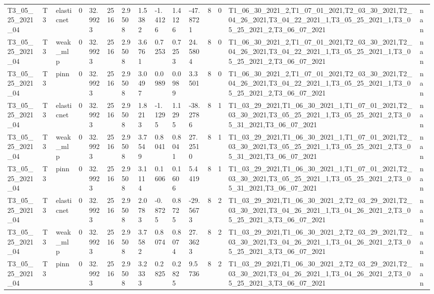 \begin{table}[t]
\begin{tabular}{lllllllllllllll}
T3\_05\_25\_2021\_04 & T3 & elasticnet & 0 & 32.9923 & 2516 & 2.9508 & 1.5382 & -1.4126 & 1.4126 & -47.8721 & 8 & 0 & T1\_06\_30\_2021\_2,T1\_07\_01\_2021,T2\_03\_30\_2021,T2\_04\_26\_2021,T3\_04\_22\_2021\_1,T3\_05\_25\_2021\_1,T3\_05\_25\_2021\_2,T3\_06\_07\_2021 & nan \\
T3\_05\_25\_2021\_04 & T3 & weak\_mlp & 0 & 32.9923 & 2516 & 2.9508 & 3.6761 & 0.7253 & 0.7253 & 24.5804 & 8 & 0 & T1\_06\_30\_2021\_2,T1\_07\_01\_2021,T2\_03\_30\_2021,T2\_04\_26\_2021,T3\_04\_22\_2021\_1,T3\_05\_25\_2021\_1,T3\_05\_25\_2021\_2,T3\_06\_07\_2021 & nan \\
T3\_05\_25\_2021\_04 & T3 & pinn & 0 & 32.9923 & 2516 & 2.9508 & 3.0497 & 0.0989 & 0.0989 & 3.3501 & 8 & 0 & T1\_06\_30\_2021\_2,T1\_07\_01\_2021,T2\_03\_30\_2021,T2\_04\_26\_2021,T3\_04\_22\_2021\_1,T3\_05\_25\_2021\_1,T3\_05\_25\_2021\_2,T3\_06\_07\_2021 & nan \\
T3\_05\_25\_2021\_04 & T3 & elasticnet & 0 & 32.9923 & 2516 & 2.9508 & 1.8213 & -1.1295 & 1.1295 & -38.2786 & 8 & 1 & T1\_03\_29\_2021,T1\_06\_30\_2021\_1,T1\_07\_01\_2021,T2\_03\_30\_2021,T3\_05\_25\_2021\_1,T3\_05\_25\_2021\_2,T3\_05\_31\_2021,T3\_06\_07\_2021 & nan \\
T3\_05\_25\_2021\_04 & T3 & weak\_mlp & 0 & 32.9923 & 2516 & 2.9508 & 3.7549 & 0.8041 & 0.8041 & 27.2510 & 8 & 1 & T1\_03\_29\_2021,T1\_06\_30\_2021\_1,T1\_07\_01\_2021,T2\_03\_30\_2021,T3\_05\_25\_2021\_1,T3\_05\_25\_2021\_2,T3\_05\_31\_2021,T3\_06\_07\_2021 & nan \\
T3\_05\_25\_2021\_04 & T3 & pinn & 0 & 32.9923 & 2516 & 2.9508 & 3.1114 & 0.1606 & 0.1606 & 5.4419 & 8 & 1 & T1\_03\_29\_2021,T1\_06\_30\_2021\_1,T1\_07\_01\_2021,T2\_03\_30\_2021,T3\_05\_25\_2021\_1,T3\_05\_25\_2021\_2,T3\_05\_31\_2021,T3\_06\_07\_2021 & nan \\
T3\_05\_25\_2021\_04 & T3 & elasticnet & 0 & 32.9923 & 2516 & 2.9508 & 2.0783 & -0.8725 & 0.8725 & -29.5673 & 8 & 2 & T1\_03\_29\_2021,T1\_06\_30\_2021\_2,T2\_03\_29\_2021,T2\_03\_30\_2021,T3\_04\_26\_2021\_1,T3\_04\_26\_2021\_2,T3\_05\_25\_2021\_3,T3\_06\_07\_2021 & nan \\
T3\_05\_25\_2021\_04 & T3 & weak\_mlp & 0 & 32.9923 & 2516 & 2.9508 & 3.7582 & 0.8074 & 0.8074 & 27.3623 & 8 & 2 & T1\_03\_29\_2021,T1\_06\_30\_2021\_2,T2\_03\_29\_2021,T2\_03\_30\_2021,T3\_04\_26\_2021\_1,T3\_04\_26\_2021\_2,T3\_05\_25\_2021\_3,T3\_06\_07\_2021 & nan \\
T3\_05\_25\_2021\_04 & T3 & pinn & 0 & 32.9923 & 2516 & 2.9508 & 3.2333 & 0.2825 & 0.2825 & 9.5736 & 8 & 2 & T1\_03\_29\_2021,T1\_06\_30\_2021\_2,T2\_03\_29\_2021,T2\_03\_30\_2021,T3\_04\_26\_2021\_1,T3\_04\_26\_2021\_2,T3\_05\_25\_2021\_3,T3\_06\_07\_2021 & nan \\

\end{tabular}
\end{table}
